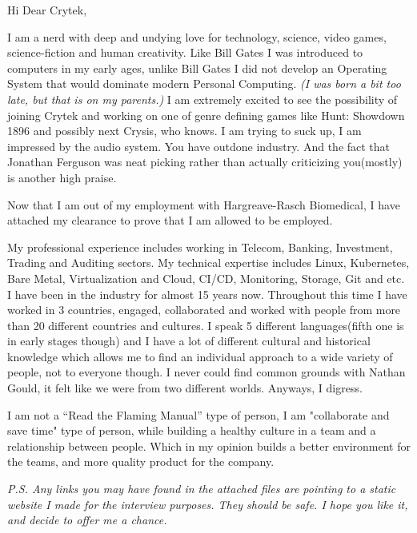 \documentclass[a4paper,1pt]{letter}
\begin{document}
\begin{letter}{}

Hi Dear Crytek,

I am a nerd with deep and undying love for technology, science, video games, science-fiction and human creativity. Like Bill Gates I was introduced to computers in my early ages, unlike Bill Gates I did not develop an Operating System that would dominate modern Personal Computing. \textit{(I was born a bit too late, but that is on my parents.)} I am extremely excited to see the possibility of joining Crytek and working on one of genre defining games like Hunt: Showdown 1896 and possibly next Crysis, who knows. I am trying to suck up, I am impressed by the audio system. You have outdone industry. And the fact that Jonathan Ferguson was neat picking rather than actually criticizing you(mostly) is another high praise.

Now that I am out of my employment with Hargreave-Rasch Biomedical, I have attached my clearance to prove that I am allowed to be employed.

My professional experience includes working in Telecom, Banking, Investment, Trading and Auditing sectors. My technical expertise includes Linux, Kubernetes, Bare Metal, Virtualization and Cloud, CI/CD, Monitoring, Storage, Git and etc. I have been in the industry for almost 15 years now. Throughout this time I have worked in 3 countries, engaged, collaborated and worked with people from more than 20 different countries and cultures. I speak 5 different languages(fifth one is in early stages though) and I have a lot of different cultural and historical knowledge which allows me to find an individual approach to a wide variety of people, not to everyone though. I never could find common grounds with Nathan Gould, it felt like we were from two different worlds. Anyways, I digress. 

I am not a “Read the Flaming Manual” type of person, I am "collaborate and save time" type of person, while building a healthy culture in a team and a relationship between people. Which in my opinion builds a better environment for the teams, and more quality product for the company.

\textit{P.S. Any links you may have found in the attached files are pointing to a static website I made for the interview purposes. They should be safe. I hope you like it, and decide to offer me a chance.}

\end{letter}
\end{document}
